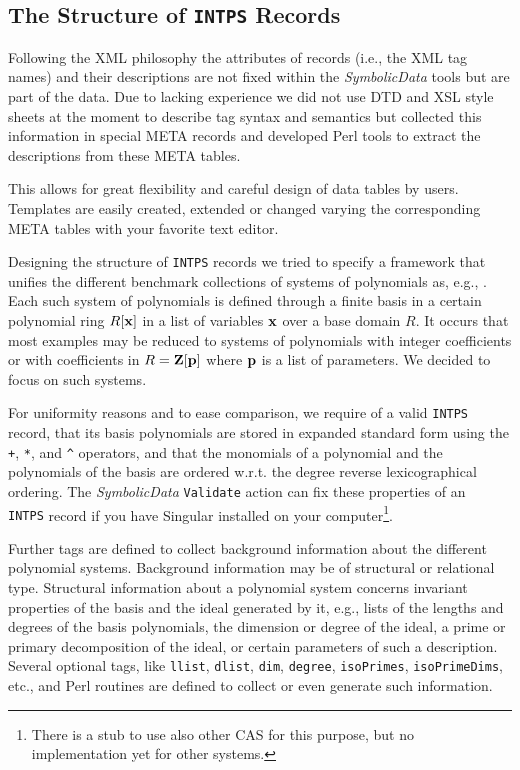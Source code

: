 \documentclass[11pt]{article}
\newcommand{\SD}{{\em Symbo\-lic\-Data}}
\begin{document}
\subsection{The Structure of {\tt INTPS} Records}

Following the XML philosophy the attributes of records (i.e., the XML
tag names) and their descriptions are not fixed within the {\SD} tools
but are part of the data.  Due to lacking experience we did not use
DTD and XSL style sheets at the moment to describe tag syntax and
semantics but collected this information in special META records and
developed Perl tools to extract the descriptions from these META
tables.

This allows for great flexibility and careful design of data tables by
users. Templates are easily created, extended or changed varying the
corresponding META tables with your favorite text editor.

Designing the structure of {\tt INTPS} records we tried to
specify a framework that unifies the different benchmark
collections of systems of polynomials as, e.g., \cite{Bini,
Boege_86a, Czapor_86a, PoSSo, Wang_92a, Wang_96a}.  Each such
system of polynomials is defined through a finite basis in a
certain polynomial ring $R[{\bf x}]$ in a list of variables ${\bf
x}$ over a base domain $R$. It occurs that most examples may be
reduced to systems of polynomials with integer coefficients or
with coefficients in $R={\bf Z}[{\bf p}]$ where ${\bf p}$ is a
list of parameters. We decided to focus on such systems.

For uniformity reasons and to ease comparison, we require of a valid
{\tt INTPS} record, that its basis polynomials are stored in expanded
standard form using the \verb?+?, \verb?*?, and \verb?^?  operators,
and that the monomials of a polynomial and the polynomials of the
basis are ordered w.r.t. the degree reverse lexicographical ordering.
The {\SD} {\tt Validate} action can fix these properties of an {\tt
INTPS} record if you have {\sc Singular} \cite{Singular} installed on
your computer\footnote{There is a stub to use also other CAS for this
purpose, but no implementation yet for other systems.}.

Further tags are defined to collect background information about the
different polynomial systems. Background information may be of
structural or relational type. Structural information about a
polynomial system concerns invariant properties of the basis and the
ideal generated by it, e.g., lists of the lengths and degrees of the
basis polynomials, the dimension or degree of the ideal, a prime or
primary decomposition of the ideal, or certain parameters of such a
description.  Several optional tags, like {\tt llist}, {\tt dlist},
{\tt dim}, {\tt degree}, {\tt isoPrimes}, {\tt isoPrimeDims}, etc.,
and Perl routines are defined to collect or even generate such
information.
\end{document}
